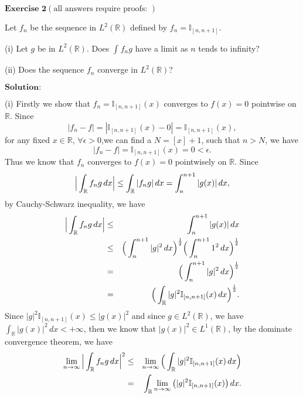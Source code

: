 \documentclass[12pt]{article}
\begin{document}
\newpage


$\textbf{Exercise 2}  (\text{all answers require proofs: })$

Let $f_{n}$ be the sequence in $L^{2}(\mathbb{R})$ defined by $f_{n} = \mathbb{I}_{[n, n+1]}$.

(i) Let $g$ be in $L^{2}(\mathbb{R})$. Does $\int_{}^{} f_{n} g$ have a limit as $n$ tends to infinity?

(ii) Does the sequence $f_{n}$ converge in $L^{2}(\mathbb{R})$?

\vspace{8pt}
$\textbf{Solution:}$

(i) Firstly we show that $f_{n} = \mathbb{I}_{[n, n+1]} (x)$ converges to $f(x) = 0$ pointwise on $\mathbb{R}$. Since 
\begin{equation*}
    |f_{n} - f| = |\mathbb{I}_{[n, n+1]} (x) - 0| = \mathbb{I}_{[n, n+1]} (x), 
\end{equation*}
for any fixed $x \in \mathbb{R}$, $\forall \epsilon > 0$,we can find a $N = [x] + 1$, such that $n > N$, we have 
\begin{equation*}
    |f_{n} - f| = \mathbb{I}_{[n, n+1]} (x) = 0 < \epsilon.
\end{equation*}
Thus we know that $f_{n}$ converges to $f(x) = 0$ pointwisely on $\mathbb{R}$. Since  
\begin{equation*}
    \Big{|} \int_{\mathbb{R}}^{} f_{n} g \, d x \Big{|} \leq \int_{\mathbb{R}}^{} | f_{n} g | \, d x = \int_{n}^{n + 1} | g (x) | \, d x,
\end{equation*}
by Cauchy-Schwarz inequality, we have
\begin{eqnarray*}
\Big{|} \int_{\mathbb{R}}^{} f_{n} g \, d x \Big{|} & \leq & \int_{n}^{n + 1} | g (x) | \, d x \\
& \leq & \Big{(} \int_{n}^{n+1} |g|^{2} \, d x \Big{)}^{\frac{1}{2}} \Big{(} \int_{n}^{n+1} 1^{2} \, d x \Big{)}^{\frac{1}{2}} \\
& = & \Big{(} \int_{n}^{n+1} |g|^{2} \, d x \Big{)}^{\frac{1}{2}} \\ 
& = & \Big{(} \int_{\mathbb{R}}^{} |g|^{2} \mathbb{I}_{[n, n+1]} (x) \, d x \Big{)}^{\frac{1}{2}}.
\end{eqnarray*}
Since $|g|^{2} \mathbb{I}_{[n, n+1]} (x) \leq |g(x)|^{2}$ and since $g \in L^{2}(\mathbb{R})$, we have $\int_{\mathbb{R}}^{} |g(x)|^{2} \, d x < + \infty$, then we know that $|g(x)|^{2} \in L^{1}(\mathbb{R})$, by the dominate convergence theorem, we have
\begin{eqnarray*}
\lim_{n \to \infty} \Big{|} \int_{\mathbb{R}}^{} f_{n} g \, d x \Big{|}^{2} & \leq & \lim_{n \to \infty} \Big{(} \int_{\mathbb{R}}^{} |g|^{2} \mathbb{I}_{[n, n+1]} (x) \, d x \Big{)} \\
& = & \int_{\mathbb{R}}^{} \lim_{n \to \infty} \big{(} |g|^{2} \mathbb{I}_{[n, n+1]} (x)  \big{)} \, d x.
\end{eqnarray*}
\end{document}
